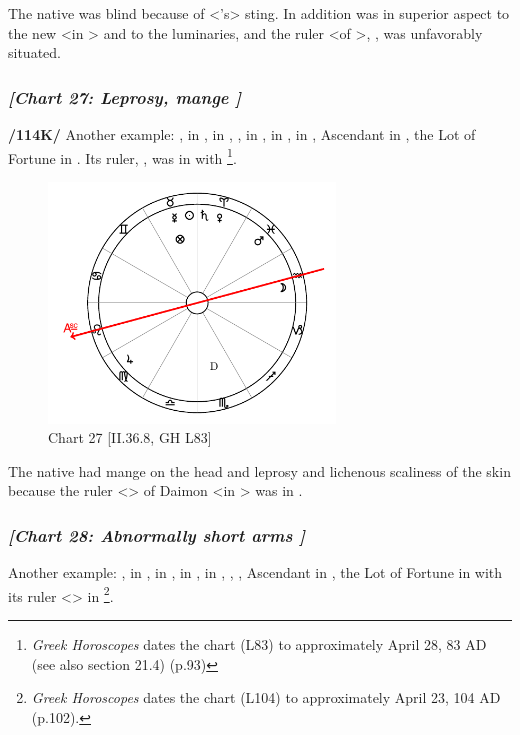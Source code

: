 The native was blind because of <\Scorpio’s> sting. In
addition \Saturn\xspace was in superior aspect to the new \Moon\xspace <in \Scorpio> and to the luminaries, and the ruler <of \Scorpio>, \Mars, was unfavorably situated.
\newpage

\subsubsection{\textit{[Chart 27: Leprosy, mange ]}}
\textbf{/114K/} Another example: \Sun, \Mercury\xspace in \Taurus, \Moon\xspace in \Aquarius, \Saturn, \Venus\xspace in \Aries, \Jupiter\xspace in \Virgo, \Mars\xspace in \Pisces, Ascendant in \Leo, the Lot of Fortune in \Taurus. Its ruler, \Venus, was in \Aries\xspace with \Saturn
\footnote{\textit{Greek Horoscopes} dates the chart (L83) to approximately April 28, 83 AD (see also section 21.4) (p.93)}. 

\clearpage
\begin{figure}
\centering
\vspace{-20pt}
\includegraphics[width=0.68\textwidth]{charts/2_36_8}
\caption{Chart 27 [II.36.8, GH L83]}
\label{fig:chart27}
\end{figure}

The native had mange on the head and leprosy and lichenous scaliness of the skin because the ruler <\Mars> of Daimon <in \Scorpio> was in \Pisces.

\newpage
\subsubsection{\textit{[Chart 28: Abnormally short arms ]}}
Another example: \Sun, \Mars\xspace in \Taurus, \Moon\xspace in \Virgo, \Saturn\xspace in \Sagittarius, \Jupiter\xspace in \Gemini, \Mercury, \Venus, Ascendant in \Aries, the Lot of Fortune in \Sagittarius with its ruler <\Jupiter> in \Gemini
\footnote{\textit{Greek Horoscopes} dates the chart (L104) to approximately April 23, 104 AD (p.102).}.

